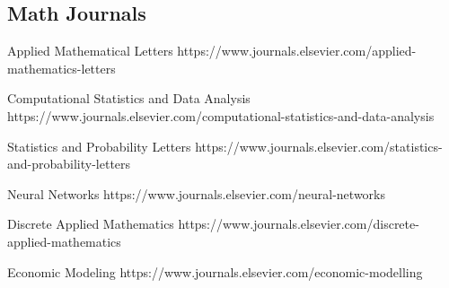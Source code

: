 \subsection{Math Journals}

 Applied Mathematical Letters
\newblock https://www.journals.elsevier.com/applied-mathematics-letters

Computational Statistics and Data Analysis
\newblock https://www.journals.elsevier.com/computational-statistics-and-data-analysis

Statistics and Probability Letters
\newblock https://www.journals.elsevier.com/statistics-and-probability-letters

Neural Networks
\newblock https://www.journals.elsevier.com/neural-networks

Discrete Applied Mathematics
\newblock https://www.journals.elsevier.com/discrete-applied-mathematics

Economic Modeling
\newblock https://www.journals.elsevier.com/economic-modelling



